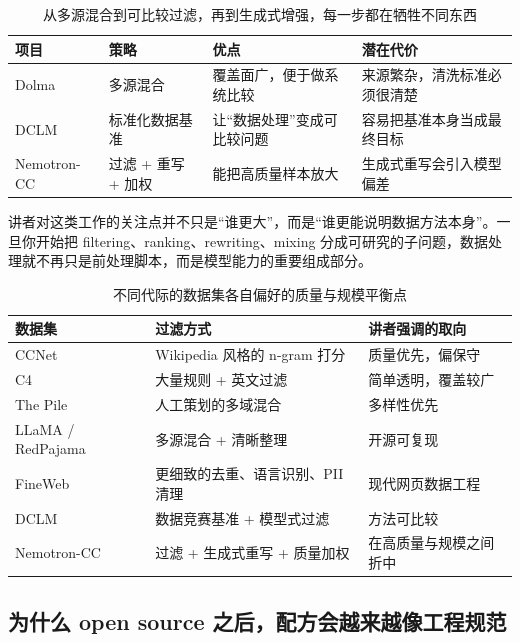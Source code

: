 \documentclass[a4paper]{article}
\begin{document}
\begin{table}[H]
\centering
\begin{tabular}{p{}p{}p{}p{}}
\toprule
\textbf{项目} & \textbf{策略} & \textbf{优点} & \textbf{潜在代价} \\
\midrule
Dolma & 多源混合 & 覆盖面广，便于做系统比较 & 来源繁杂，清洗标准必须很清楚 \\
DCLM & 标准化数据基准 & 让“数据处理”变成可比较问题 & 容易把基准本身当成最终目标 \\
Nemotron-CC & 过滤 + 重写 + 加权 & 能把高质量样本放大 & 生成式重写会引入模型偏差 \\
\bottomrule
\end{tabular}
\caption{从多源混合到可比较过滤，再到生成式增强，每一步都在牺牲不同东西}
\end{table}

讲者对这类工作的关注点并不只是“谁更大”，而是“谁更能说明数据方法本身”。一旦你开始把 filtering、ranking、rewriting、mixing 分成可研究的子问题，数据处理就不再只是前处理脚本，而是模型能力的重要组成部分。

\begin{table}[H]
\centering
\begin{tabular}{p{}p{}p{}}
\toprule
\textbf{数据集} & \textbf{过滤方式} & \textbf{讲者强调的取向} \\
\midrule
CCNet & Wikipedia 风格的 n-gram 打分 & 质量优先，偏保守 \\
C4 & 大量规则 + 英文过滤 & 简单透明，覆盖较广 \\
The Pile & 人工策划的多域混合 & 多样性优先 \\
LLaMA / RedPajama & 多源混合 + 清晰整理 & 开源可复现 \\
FineWeb & 更细致的去重、语言识别、PII 清理 & 现代网页数据工程 \\
DCLM & 数据竞赛基准 + 模型式过滤 & 方法可比较 \\
Nemotron-CC & 过滤 + 生成式重写 + 质量加权 & 在高质量与规模之间折中 \\
\bottomrule
\end{tabular}
\caption{不同代际的数据集各自偏好的质量与规模平衡点}
\end{table}

\subsection{为什么 open source 之后，配方会越来越像工程规范}
\end{document}
